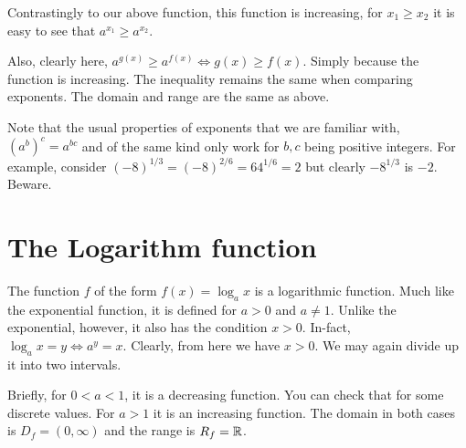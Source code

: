  Contrastingly to our above function, this function is increasing, for \(x_1 \ge x_2\) it is easy
 to see that \(a^{x_1} \ge a^{x_2}\). 

 \begin{figure}
    [H]
    \centering
 \end{figure}

 Also, clearly here, \(a^{g(x)} \ge a^{f(x)} \iff g(x) \ge f(x)\). Simply because the function is 
increasing. The inequality remains the same when comparing exponents. The domain and range
are the same as above. 

\begin{remark}
    Note that the usual properties of exponents that we are familiar with, \((a^{b})^{c} = a^{bc}\)
    and of the same kind only work for \(b, c\) being positive integers. For example, consider
    \((-8)^{1/3} = (-8)^{2/6} = 64^{1/6} = 2\) but clearly \(-8^{1/3}\) is \(-2\). Beware.
\end{remark}

\section{The Logarithm function}

The function \(f\) of the form \(f(x) = \log_{a} x\) is a logarithmic function. Much like 
the exponential function, it is defined for \(a > 0\) and \(a \ne 1\). Unlike the exponential, 
however, it also has the condition \(x > 0\). In-fact, \(\log_{a} x = y \iff a^y = x\). Clearly,
from here we have \(x > 0\). We may again divide up it into two intervals.

Briefly, for \(0 < a < 1\), it is a decreasing function. You can check that for 
some discrete values. For \(a > 1\) it is an increasing function. The domain in
both cases is \(D_f = (0, \infty)\) and the range is \(R_f = \mathbb R\). 

